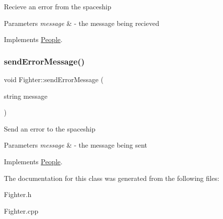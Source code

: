 Recieve an error from the spaceship 
\begin{DoxyParams}{Parameters}
{\em message} & -\/ the message being recieved \\
\hline
\end{DoxyParams}


Implements \hyperlink{classPeople_a0685df78be631783138865e03cc7c85d}{People}.

\mbox{\label{classFighter_a42b60e52427e5c69daf141351655805c}} 
\subsubsection{\texorpdfstring{send\+Error\+Message()}{sendErrorMessage()}}
{\footnotesize\ttfamily void Fighter\+::send\+Error\+Message (\begin{DoxyParamCaption}\item[{string}]{message }\end{DoxyParamCaption})\hspace{0.3cm}{\ttfamily [virtual]}}

Send an error to the spaceship 
\begin{DoxyParams}{Parameters}
{\em message} & -\/ the message being sent \\
\hline
\end{DoxyParams}


Implements \hyperlink{classPeople_a572a35170f61d1848eb04b65baafb057}{People}.



The documentation for this class was generated from the following files\+:\begin{DoxyCompactItemize}
\item 
Fighter.\+h\item 
Fighter.\+cpp\end{DoxyCompactItemize}
